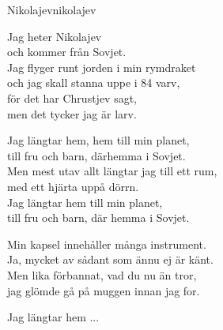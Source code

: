 \begin{song}{Nikolajev}{nikolajev}
\begin{vers}
Jag heter Nikolajev\\
och kommer från Sovjet.\\
Jag flyger runt jorden i min rymdraket\\
och jag skall stanna uppe i 84 varv,\\
för det har Chrustjev sagt,\\
men det tycker jag är larv.\\
\end{vers}
\begin{vers}
Jag längtar hem, hem till min planet,\\
till fru och barn, därhemma i Sovjet.\\
Men mest utav allt längtar jag till ett rum,\\
med ett hjärta uppå dörrn.\\
Jag längtar hem till min planet,\\
till fru och barn, där hemma i Sovjet.\\
\end{vers}
\begin{vers}
Min kapsel innehåller många instrument.\\
Ja, mycket av sådant som ännu ej är känt.\\
Men lika förbannat, vad du nu än tror,\\
jag glömde gå på muggen innan jag for.\\
\end{vers}
\begin{vers}
Jag längtar hem ...\\
\end{vers}
\end{song}
